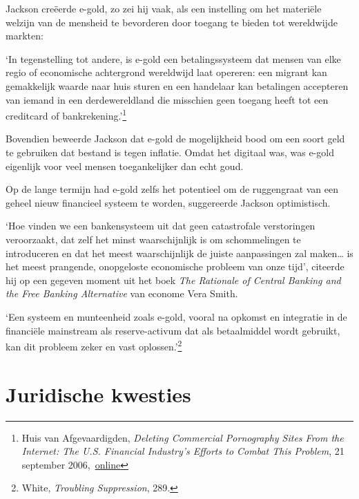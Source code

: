 \documentclass[
  a5paper,
  smalldemyvopaper,11pt,twoside,onecolumn,openright,extrafontsizes,
hidelinks]{memoir}
\renewenvironment{quote}%
               {\list{}{\rightmargin=.3cm\leftmargin=.3cm}%
                \itshape \item[]}%
               {\endlist}
\begin{document}
Jackson creëerde e-gold, zo zei hij vaak, als een instelling om het
materiële welzijn van de mensheid te bevorderen door toegang te bieden
tot wereldwijde markten:

\begin{quote}
`In tegenstelling tot andere, is e-gold een betalingssysteem dat mensen
van elke regio of economische achtergrond wereldwijd laat opereren: een
migrant kan gemakkelijk waarde naar huis sturen en een handelaar kan
betalingen accepteren van iemand in een derdewereldland die misschien
geen toegang heeft tot een creditcard of bankrekening.'\footnote{Huis
  van Afgevaardigden, \emph{Deleting Commercial Pornography Sites From
  the Internet: The U.S. Financial Industry's Efforts to Combat This
  Problem}, 21 september
  2006,~\href{https://www.govinfo.gov/content/pkg/CHRG-109hhrg31467/html/CHRG-109hhrg31467.htm}{online}}
\end{quote}

Bovendien beweerde Jackson dat e-gold de mogelijkheid bood om een soort
geld te gebruiken dat bestand is tegen inflatie. Omdat het digitaal was,
was e-gold eigenlijk voor veel mensen toegankelijker dan echt goud.

Op de lange termijn had e-gold zelfs het potentieel om de ruggengraat
van een geheel nieuw financieel systeem te worden, suggereerde Jackson
optimistisch.

`Hoe vinden we een bankensysteem uit dat geen catastrofale verstoringen
veroorzaakt, dat zelf het minst waarschijnlijk is om schommelingen te
introduceren en dat het meest waarschijnlijk de juiste aanpassingen zal
maken\ldots{} is het meest prangende, onopgeloste economische probleem
van onze tijd', citeerde hij op een gegeven moment uit het boek
\emph{The Rationale of Central Banking and the Free Banking Alternative}
van econome Vera Smith.

\begin{quote}
`Een systeem en munteenheid zoals e-gold, vooral na opkomst en
integratie in de financiële mainstream als reserve-activum dat als
betaalmiddel wordt gebruikt, kan dit probleem zeker en vast
oplossen.'\footnote{\hspace{0pt}White, \emph{Troubling Suppression},
  289.}
\end{quote}

\vspace{-3em}
\section*{Juridische kwesties}\label{juridische-kwesties}
\end{document}
